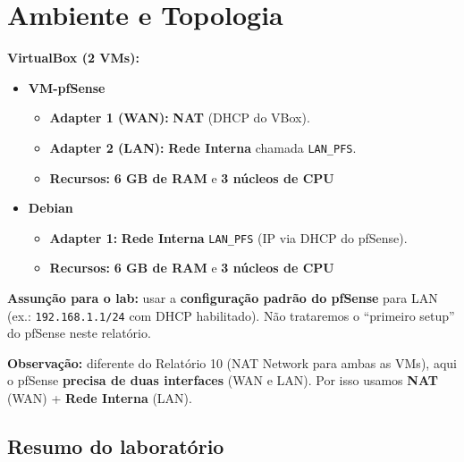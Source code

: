 \section{Ambiente e Topologia}

\textbf{VirtualBox (2 VMs):}
\begin{itemize}
  \item \textbf{VM-pfSense}
  \begin{itemize}
    \item \textbf{Adapter 1 (WAN):} \textbf{NAT} (DHCP do VBox).
    \item \textbf{Adapter 2 (LAN):} \textbf{Rede Interna} chamada \texttt{LAN\_PFS}.
    \item \textbf{Recursos:} \textbf{6 GB de RAM} e \textbf{3 núcleos de CPU}
  \end{itemize}
  \item \textbf{Debian}
  \begin{itemize}
    \item \textbf{Adapter 1:} \textbf{Rede Interna} \texttt{LAN\_PFS} (IP via DHCP do pfSense).
    \item \textbf{Recursos:} \textbf{6 GB de RAM} e \textbf{3 núcleos de CPU}
  \end{itemize}
\end{itemize}

\begin{notebox}
\textbf{Assunção para o lab:} usar a \textbf{configuração padrão do pfSense} para LAN (ex.: \texttt{192.168.1.1/24} com DHCP habilitado). Não trataremos o ``primeiro setup'' do pfSense neste relatório.
\end{notebox}

\begin{notebox}
\textbf{Observação:} diferente do Relatório 10 (NAT Network para ambas as VMs), aqui o pfSense \textbf{precisa de duas interfaces} (WAN e LAN). Por isso usamos \textbf{NAT} (WAN) + \textbf{Rede Interna} (LAN).
\end{notebox}

\subsection{Resumo do laboratório}

